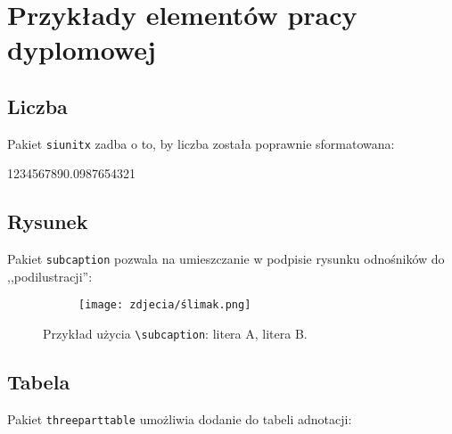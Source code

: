 \chapter{Przykłady elementów pracy dyplomowej}

\section{Liczba}

Pakiet \texttt{siunitx} zadba o to, by liczba została poprawnie sformatowana: \\
\begin{center}
	\num{1234567890.0987654321}
\end{center}


\section{Rysunek}

Pakiet \texttt{subcaption} pozwala na umieszczanie w podpisie rysunku odnośników do ,,podilustracji'': \\

\begin{figure}[h]
	\centering
	\begin{subfigure}{0.35\textwidth}
		\centering
		\texttt{[image: zdjecia/ślimak.png]}
	\end{subfigure}
	\begin{subfigure}{0.35\textwidth}
		\centering
		\subcaption{\label{subfigure_b}}
	\end{subfigure}
	
	\caption{\label{fig:subcaption_example}Przykład użycia \texttt{\textbackslash subcaption}: \protect{} litera A, \protect{} litera B.}
\end{figure}

\section{Tabela}

Pakiet \texttt{threeparttable} umożliwia dodanie do tabeli adnotacji: \\

